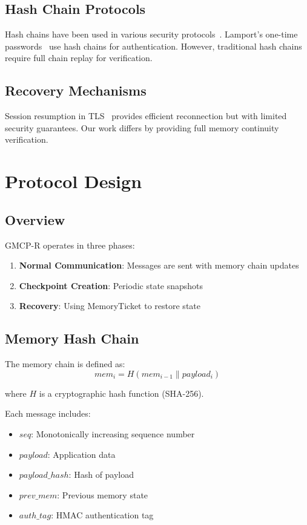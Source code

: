 \documentclass[conference]{IEEEtran}
\begin{document}
\subsection{Hash Chain Protocols}

Hash chains have been used in various security protocols~\cite{hashchain}. Lamport's one-time passwords~\cite{lamport} use hash chains for authentication. However, traditional hash chains require full chain replay for verification.

\subsection{Recovery Mechanisms}

Session resumption in TLS~\cite{sessionresumption} provides efficient reconnection but with limited security guarantees. Our work differs by providing full memory continuity verification.

\section{Protocol Design}
\label{sec:protocol}

\subsection{Overview}

GMCP-R operates in three phases:
\begin{enumerate}
\item \textbf{Normal Communication}: Messages are sent with memory chain updates
\item \textbf{Checkpoint Creation}: Periodic state snapshots
\item \textbf{Recovery}: Using MemoryTicket to restore state
\end{enumerate}

\subsection{Memory Hash Chain}

The memory chain is defined as:
\begin{equation}
mem_i = H(mem_{i-1} \| payload_i)
\end{equation}

where $H$ is a cryptographic hash function (SHA-256).

Each message includes:
\begin{itemize}
\item $seq$: Monotonically increasing sequence number
\item $payload$: Application data
\item $payload\_hash$: Hash of payload
\item $prev\_mem$: Previous memory state
\item $auth\_tag$: HMAC authentication tag
\end{itemize}
\end{document}
